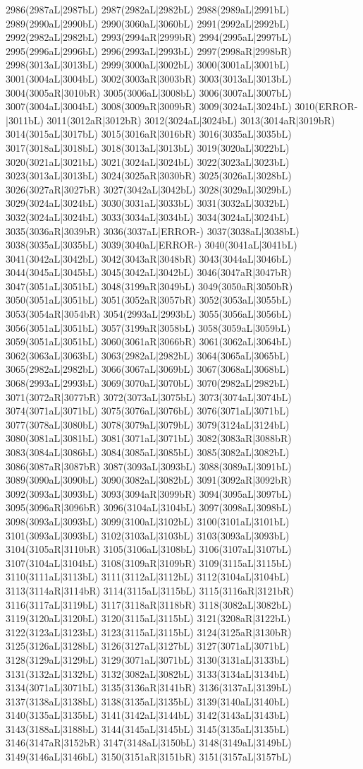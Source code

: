 2986(2987aL|2987bL) 2987(2982aL|2982bL) 2988(2989aL|2991bL) 2989(2990aL|2990bL) 2990(3060aL|3060bL) 2991(2992aL|2992bL) 2992(2982aL|2982bL) 2993(2994aR|2999bR) 2994(2995aL|2997bL) 2995(2996aL|2996bL) 2996(2993aL|2993bL) 2997(2998aR|2998bR) 2998(3013aL|3013bL) 2999(3000aL|3002bL) 3000(3001aL|3001bL) 3001(3004aL|3004bL) 3002(3003aR|3003bR) 3003(3013aL|3013bL) 3004(3005aR|3010bR) 3005(3006aL|3008bL) 3006(3007aL|3007bL) 3007(3004aL|3004bL) 3008(3009aR|3009bR) 3009(3024aL|3024bL) 3010(ERROR-|3011bL) 3011(3012aR|3012bR) 3012(3024aL|3024bL) 3013(3014aR|3019bR) 3014(3015aL|3017bL) 3015(3016aR|3016bR) 3016(3035aL|3035bL) 3017(3018aL|3018bL) 3018(3013aL|3013bL) 3019(3020aL|3022bL) 3020(3021aL|3021bL) 3021(3024aL|3024bL) 3022(3023aL|3023bL) 3023(3013aL|3013bL) 3024(3025aR|3030bR) 3025(3026aL|3028bL) 3026(3027aR|3027bR) 3027(3042aL|3042bL) 3028(3029aL|3029bL) 3029(3024aL|3024bL) 3030(3031aL|3033bL) 3031(3032aL|3032bL) 3032(3024aL|3024bL) 3033(3034aL|3034bL) 3034(3024aL|3024bL) 3035(3036aR|3039bR) 3036(3037aL|ERROR-) 3037(3038aL|3038bL) 3038(3035aL|3035bL) 3039(3040aL|ERROR-) 3040(3041aL|3041bL) 3041(3042aL|3042bL) 3042(3043aR|3048bR) 3043(3044aL|3046bL) 3044(3045aL|3045bL) 3045(3042aL|3042bL) 3046(3047aR|3047bR) 3047(3051aL|3051bL) 3048(3199aR|3049bL) 3049(3050aR|3050bR) 3050(3051aL|3051bL) 3051(3052aR|3057bR) 3052(3053aL|3055bL) 3053(3054aR|3054bR) 3054(2993aL|2993bL) 3055(3056aL|3056bL) 3056(3051aL|3051bL) 3057(3199aR|3058bL) 3058(3059aL|3059bL) 3059(3051aL|3051bL) 3060(3061aR|3066bR) 3061(3062aL|3064bL) 3062(3063aL|3063bL) 3063(2982aL|2982bL) 3064(3065aL|3065bL) 3065(2982aL|2982bL) 3066(3067aL|3069bL) 3067(3068aL|3068bL) 3068(2993aL|2993bL) 3069(3070aL|3070bL) 3070(2982aL|2982bL) 3071(3072aR|3077bR) 3072(3073aL|3075bL) 3073(3074aL|3074bL) 3074(3071aL|3071bL) 3075(3076aL|3076bL) 3076(3071aL|3071bL) 3077(3078aL|3080bL) 3078(3079aL|3079bL) 3079(3124aL|3124bL) 3080(3081aL|3081bL) 3081(3071aL|3071bL) 3082(3083aR|3088bR) 3083(3084aL|3086bL) 3084(3085aL|3085bL) 3085(3082aL|3082bL) 3086(3087aR|3087bR) 3087(3093aL|3093bL) 3088(3089aL|3091bL) 3089(3090aL|3090bL) 3090(3082aL|3082bL) 3091(3092aR|3092bR) 3092(3093aL|3093bL) 3093(3094aR|3099bR) 3094(3095aL|3097bL) 3095(3096aR|3096bR) 3096(3104aL|3104bL) 3097(3098aL|3098bL) 3098(3093aL|3093bL) 3099(3100aL|3102bL) 3100(3101aL|3101bL) 3101(3093aL|3093bL) 3102(3103aL|3103bL) 3103(3093aL|3093bL) 3104(3105aR|3110bR) 3105(3106aL|3108bL) 3106(3107aL|3107bL) 3107(3104aL|3104bL) 3108(3109aR|3109bR) 3109(3115aL|3115bL) 3110(3111aL|3113bL) 3111(3112aL|3112bL) 3112(3104aL|3104bL) 3113(3114aR|3114bR) 3114(3115aL|3115bL) 3115(3116aR|3121bR) 3116(3117aL|3119bL) 3117(3118aR|3118bR) 3118(3082aL|3082bL) 3119(3120aL|3120bL) 3120(3115aL|3115bL) 3121(3208aR|3122bL) 3122(3123aL|3123bL) 3123(3115aL|3115bL) 3124(3125aR|3130bR) 3125(3126aL|3128bL) 3126(3127aL|3127bL) 3127(3071aL|3071bL) 3128(3129aL|3129bL) 3129(3071aL|3071bL) 3130(3131aL|3133bL) 3131(3132aL|3132bL) 3132(3082aL|3082bL) 3133(3134aL|3134bL) 3134(3071aL|3071bL) 3135(3136aR|3141bR) 3136(3137aL|3139bL) 3137(3138aL|3138bL) 3138(3135aL|3135bL) 3139(3140aL|3140bL) 3140(3135aL|3135bL) 3141(3142aL|3144bL) 3142(3143aL|3143bL) 3143(3188aL|3188bL) 3144(3145aL|3145bL) 3145(3135aL|3135bL) 3146(3147aR|3152bR) 3147(3148aL|3150bL) 3148(3149aL|3149bL) 3149(3146aL|3146bL) 3150(3151aR|3151bR) 3151(3157aL|3157bL) 